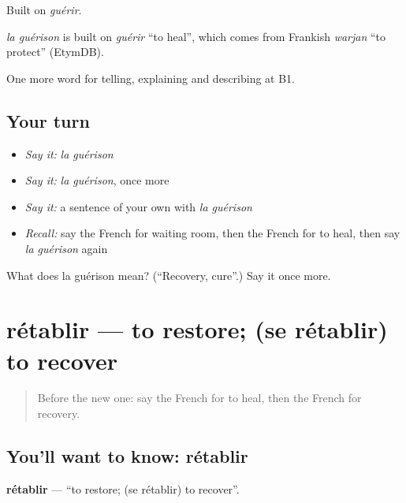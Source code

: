 Built on \emph{guérir}.

\begin{cousinweb}
\emph{la guérison} is built on \emph{guérir} \textquotedblleft{}to heal\textquotedblright{}, which comes from Frankish \emph{warjan} \textquotedblleft{}to protect\textquotedblright{} (EtymDB).
\end{cousinweb}

\begin{grammarlens}[title={What you've built}]
One more word for telling, explaining and describing at B1.
\end{grammarlens}

\subsection*{Your turn}
\begin{itemize}
\raggedright
  \item \emph{Say it:} \emph{la guérison}
  \item \emph{Say it:} \emph{la guérison}, once more
  \item \emph{Say it:} a sentence of your own with \emph{la guérison}
  \item \emph{Recall:} say the French for waiting room, then the French for to heal, then say \emph{la guérison} again
\end{itemize}

\begin{tcolorbox}[breakable,colback=teal!4,colframe=teal!35!black,title={Before you move on}]
What does la guérison mean? (\textquotedblleft{}Recovery, cure\textquotedblright{}.) Say it once more.
\end{tcolorbox}
\section[rétablir]{rétablir — to restore; (se rétablir) to recover}

\label{lesson:FR-C485-retablir}



\begin{quote}
Before the new one: say the French for to heal, then the French for recovery.
\end{quote}

\subsection*{You'll want to know: rétablir}
\textbf{rétablir} — \textquotedblleft{}to restore; (se rétablir) to recover\textquotedblright{}.

